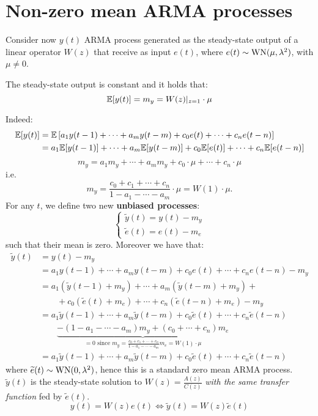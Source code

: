 \section{Non-zero mean ARMA processes}\label{sec:non-zero-mean-arma}
Consider now $y(t)$ ARMA process generated as the steady-state output of a linear operator $W(z)$ that receive as input $e(t)$, where $e(t) \sim \operatorname{WN}(\mu, \lambda^{2})$, with $\mu\neq0$.

\begin{thm}\label{thm:gain-theorem}
	The steady-state output is constant and it holds that:
	\[
		\mathbb{E}[y(t)]=m_{y}=W(z)|_{z=1} \cdot \mu
	\]
\end{thm}

Indeed:
\begin{align*}
		\mathbb{E}[y(t)] &=\mathbb{E}\left[a_{1} y(t-1)+\cdots+a_{m} y(t-m)+c_{0} e(t)+\cdots+c_{n} e(t-n)\right] \\
		&=a_{1} \mathbb{E}[y(t-1)]+\cdots+a_{m} \mathbb{E}[y(t-m)]+c_{0} \mathbb{E}[e(t)]+\cdots+c_{n} \mathbb{E}[e(t-n)]
\end{align*}
$$
m_{y}=a_{1} m_{y}+\cdots+a_{m} m_{y}+c_{0} \cdot \mu+\cdots+c_{n} \cdot \mu
$$
i.e.
\[
	m_{y}=\frac{c_{0}+c_{1}+\cdots+c_{n}}{1-a_{1}-\cdots-a_{m}} \cdot \mu=W(1) \cdot \mu.
\]
For any $t$, we define two new \textbf{unbiased processes}:
$$
\boxed{
	\begin{cases}
		\tilde{y}(t)=y(t)-m_{y}\\
		\tilde{e}(t)=e(t)-m_{e}
	\end{cases}
}
$$
such that their mean is zero. Moreover we have that:
\begin{align*}
	\tilde{y}(t)&= y(t)-m_{y}\\
	&= a_{1} y(t-1)+\cdots+a_{m} y(t-m)+c_{0} e(t)+\cdots+c_{n} e(t-n)-m_{y} \\
	&= a_{1}\left(\tilde{y}(t-1)+m_{y}\right)+\cdots+a_{m }\left(\tilde{y}(t-m)+m_{y}\right)+\\
	&\qquad +c_{0}\left(\tilde{e}(t)+m_{e}\right)+\cdots+c_{n}\left(\tilde{e}(t-n)+m_{e}\right)-m_{y} \\
	&= a_{1} \tilde{y}(t-1)+\cdots+a_{m} \tilde{y}(t-m)+c_{0} \tilde{e}(t)+\cdots+c_{n} \tilde{e}(t-n) \\
	&\qquad \underbrace{-\left(1-a_{1}-\cdots-a_{m}\right) m_{y}+\left(c_{0}+\cdots + c_{n}\right) m_{e}}_{=0\text { since } m_{y}=\frac{c_{0}+c_{1}+\cdots+c_{n}}{1-a_{1}-\cdots-a_{m }} m_{e}=W(1) \cdot \mu} \\
	&=a_{1} \tilde{y}(t-1)+\cdots+a_{m} \tilde{y}(t-m)+c_{0} \tilde{e}(t)+\cdots+c_{n} \tilde{e}(t-n)
\end{align*}
where $\widetilde{e}(t)\sim \operatorname{WN}(0, \lambda^{2})$, hence this is a standard zero mean ARMA process. $\tilde{y}(t)$ is the steady-state solution to $W(z)=\frac{A(z)}{C(z)}$ \emph{with the same transfer function} fed by $\tilde{e}(t)$.
\[
	\boxed{y(t)=W(z)e(t) \iff \tilde{y}(t)=W(z)\tilde{e}(t)}
\]

